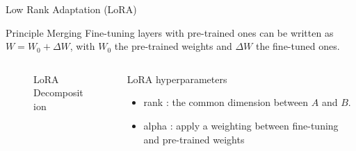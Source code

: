 \begin{frame}{Low Rank Adaptation (LoRA)}
    \begin{block}{Principle}
        Merging Fine-tuning layers with pre-trained ones can be written as $W = W_0 + \Delta W$, with $W_0$ the pre-trained weights and $\Delta W$ the fine-tuned ones.         
    \end{block}

    \begin{columns}
        \begin{column}[t]{0.45\textwidth}
        \begin{figure}
            \centering
            
            \caption{LoRA Decomposition}
        \end{figure}
            
        \end{column}
        
        \begin{column}[t]{0.3\textwidth}
            \begin{block}{LoRA hyperparameters}
            \begin{itemize}
                \item rank : the common dimension between $A$ and $B$.
                \item alpha : apply a weighting between fine-tuning and pre-trained weights
            \end{itemize}
                
            \end{block}
            
        \end{column}
    \end{columns}
    
\end{frame}
